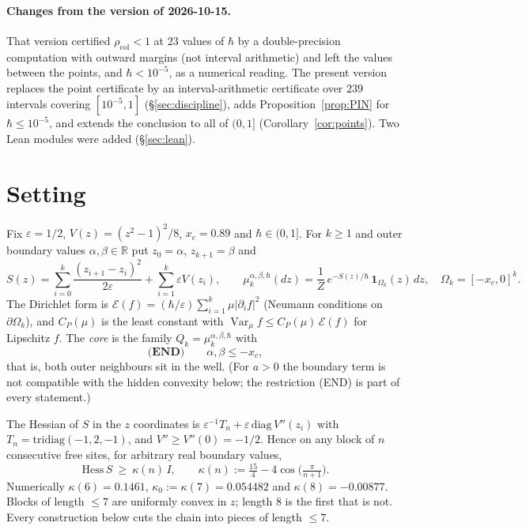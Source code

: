 \documentclass[11pt,a4paper]{article}
\theoremstyle{definition}
\theoremstyle{remark}
\newcommand{\R}{\mathbb{R}}
\newcommand{\Var}{\operatorname{Var}}
\newcommand{\cE}{\mathcal{E}}
\newcommand{\xc}{x_c}
\newcommand{\rcol}{\rho_{\mathrm{col}}}
\begin{document}
\paragraph{Changes from the version of 2026-10-15.} That version certified $\rcol<1$ at $23$ values of $\hbar$ by a double-precision computation with outward margins (not interval arithmetic) and left the values between the points, and $\hbar<10^{-5}$, as a numerical reading. The present version replaces the point certificate by an interval-arithmetic certificate over $239$ intervals covering $[10^{-5},1]$ (\S\ref{sec:discipline}), adds Proposition~\ref{prop:PIN} for $\hbar\le10^{-5}$, and extends the conclusion to all of $(0,1]$ (Corollary~\ref{cor:points}). Two Lean modules were added (\S\ref{sec:lean}).

\section{Setting}\label{sec:setting}

Fix $\varepsilon=1/2$, $V(z)=(z^2-1)^2/8$, $\xc=0.89$ and $\hbar\in(0,1]$. For $k\ge1$ and outer boundary values $\alpha,\beta\in\R$ put $z_0=\alpha$, $z_{k+1}=\beta$ and
\[
S(z)=\sum_{i=0}^{k}\frac{(z_{i+1}-z_i)^2}{2\varepsilon}+\sum_{i=1}^{k}\varepsilon V(z_i),\qquad
\mu_k^{\alpha,\beta,\hbar}(dz)=\frac{1}{Z}\,e^{-S(z)/\hbar}\,\mathbf 1_{\Omega_k}(z)\,dz,\quad \Omega_k=[-\xc,0]^k .
\]
The Dirichlet form is $\cE(f)=(\hbar/\varepsilon)\sum_{i=1}^k\mu|\partial_if|^2$ (Neumann conditions on $\partial\Omega_k$), and $C_P(\mu)$ is the least constant with $\Var_\mu f\le C_P(\mu)\,\cE(f)$ for Lipschitz $f$. The \emph{core} is the family $Q_k=\mu_k^{\alpha,\beta,\hbar}$ with
\[
\textbf{(END)}\qquad \alpha,\beta\le-\xc ,
\]
that is, both outer neighbours sit in the well. (For $a>0$ the boundary term is not compatible with the hidden convexity below; the restriction (END) is part of every statement.)

The Hessian of $S$ in the $z$ coordinates is $\varepsilon^{-1}T_n+\varepsilon\,\mathrm{diag}\,V''(z_i)$ with $T_n=\mathrm{tridiag}(-1,2,-1)$, and $V''\ge V''(0)=-1/2$. Hence on any block of $n$ consecutive free sites, for arbitrary real boundary values,
\begin{equation}\label{eq:kappa}
\mathrm{Hess}\,S\ \ge\ \kappa(n)\,I,\qquad \kappa(n):=\tfrac{15}{4}-4\cos\!\big(\tfrac{\pi}{n+1}\big).
\end{equation}
Numerically $\kappa(6)=0.1461$, $\kappa_0:=\kappa(7)=0.054482$ and $\kappa(8)=-0.00877$. Blocks of length $\le7$ are uniformly convex in $z$; length $8$ is the first that is not. Every construction below cuts the chain into pieces of length $\le7$.
\end{document}
